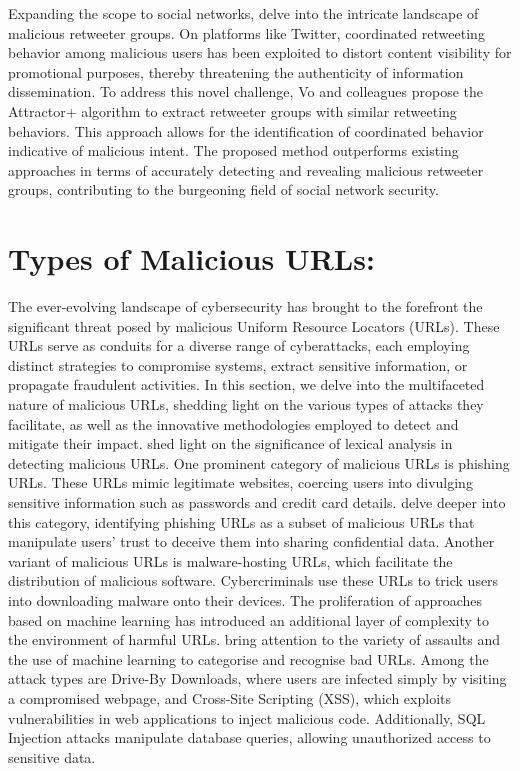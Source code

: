 Expanding the scope to social networks,\cite{vo2017revealing} delve into the intricate landscape of malicious retweeter groups. On platforms like Twitter, coordinated retweeting behavior among malicious users has been exploited to distort content visibility for promotional purposes, thereby threatening the authenticity of information dissemination. To address this novel challenge, Vo and colleagues propose the Attractor+ algorithm to extract retweeter groups with similar retweeting behaviors. This approach allows for the identification of coordinated behavior indicative of malicious intent. The proposed method outperforms existing approaches in terms of accurately detecting and revealing malicious retweeter groups, contributing to the burgeoning field of social network security.


\section{Types of Malicious URLs:}
The ever-evolving landscape of cybersecurity has brought to the forefront the significant threat posed by malicious Uniform Resource Locators (URLs). These URLs serve as conduits for a diverse range of cyberattacks, each employing distinct strategies to compromise systems, extract sensitive information, or propagate fraudulent activities. In this section, we delve into the multifaceted nature of malicious URLs, shedding light on the various types of attacks they facilitate, as well as the innovative methodologies employed to detect and mitigate their impact.
 \cite{mamun2016detecting} shed light on the significance of lexical analysis in detecting malicious URLs. One prominent category of malicious URLs is phishing URLs. These URLs mimic legitimate websites, coercing users into divulging sensitive information such as passwords and credit card details. \cite{choi2011detecting} delve deeper into this category, identifying phishing URLs as a subset of malicious URLs that manipulate users' trust to deceive them into sharing confidential data. Another variant of malicious URLs is malware-hosting URLs, which facilitate the distribution of malicious software. Cybercriminals use these URLs to trick users into downloading malware onto their devices. 
The proliferation of approaches based on machine learning has introduced an additional layer of complexity to the environment of harmful URLs. \cite{aljabri2022detecting} bring attention to the variety of assaults and the use of machine learning to categorise and recognise bad URLs. Among the attack types are Drive-By Downloads, where users are infected simply by visiting a compromised webpage, and Cross-Site Scripting (XSS), which exploits vulnerabilities in web applications to inject malicious code. Additionally, SQL Injection attacks manipulate database queries, allowing unauthorized access to sensitive data.
